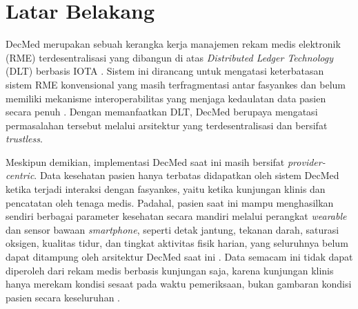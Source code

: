 \section{Latar Belakang}\label{sec:latar-belakang}

\sloppy

DecMed merupakan sebuah kerangka kerja manajemen rekam medis elektronik (RME) terdesentralisasi yang dibangun di atas \textit{Distributed Ledger Technology} (DLT) berbasis IOTA \parencite{Purnama_2026}.
Sistem ini dirancang untuk mengatasi keterbatasan sistem RME konvensional yang masih terfragmentasi antar fasyankes dan belum memiliki mekanisme interoperabilitas yang menjaga kedaulatan data pasien secara penuh \parencite{Purnama_2026}.
Dengan memanfaatkan DLT, DecMed berupaya mengatasi permasalahan tersebut melalui arsitektur yang terdesentralisasi dan bersifat \textit{trustless}.

Meskipun demikian, implementasi DecMed saat ini masih bersifat \textit{provider-centric}.
Data kesehatan pasien hanya terbatas didapatkan oleh sistem DecMed ketika terjadi interaksi dengan fasyankes, yaitu ketika kunjungan klinis dan pencatatan oleh tenaga medis.
Padahal, pasien saat ini mampu menghasilkan sendiri berbagai parameter kesehatan secara mandiri melalui perangkat \textit{wearable} dan sensor bawaan \textit{smartphone}, seperti detak jantung, tekanan darah, saturasi oksigen, kualitas tidur, dan tingkat aktivitas fisik harian, yang seluruhnya belum dapat ditampung oleh arsitektur DecMed saat ini \parencite{Omoloja_Vundavalli_2021_PGHD_Benefits_Challenges}. 
Data semacam ini tidak dapat diperoleh dari rekam medis berbasis kunjungan saja, karena kunjungan klinis hanya merekam kondisi sesaat pada waktu pemeriksaan, bukan gambaran kondisi pasien secara keseluruhan \parencite{Cohen_Keller_Hayes_Dorr_Ash_Sittig_2016_PGHD_Integration_EHR}.

